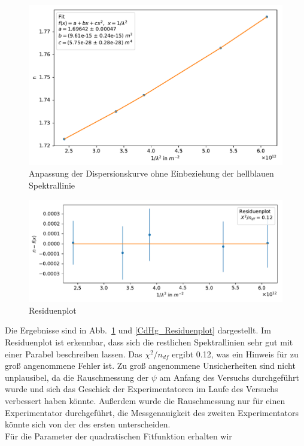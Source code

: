 \documentclass[12pt,a4paper]{article}
\begin{document}
\begin{figure}[H]
	\centering
	\includegraphics[width=0.95\linewidth]{Python/CdHg_Fit.pdf}
	\caption{Anpassung der Dispersionskurve ohne Einbeziehung der hellblauen Spektrallinie}
	\label{CdHg_LinReg}
\end{figure}
\begin{figure}[H]
	\centering
	\includegraphics[width=\linewidth]{Python/CdHg_Residuen.pdf}
	\caption{Residuenplot}
	\label{CdHg_Residuenplot}
\end{figure}
Die Ergebnisse sind in Abb.~\ref{CdHg_LinReg} und \eqref{CdHg_Residuenplot} dargestellt. Im Residuenplot ist erkennbar, dass sich die restlichen Spektrallinien sehr gut mit einer Parabel beschreiben lassen. Das $\chi^2/n_{df}$ ergibt 0.12, was ein Hinweis für zu groß angenommene Fehler ist. Zu groß angenommene Unsicherheiten sind nicht unplausibel, da die Rauschmessung der $\psi$ am Anfang des Versuchs durchgeführt wurde und sich das Geschick der Experimentatoren im Laufe des Versuchs verbessert haben könnte. Außerdem wurde die Rauschmessung nur für einen Experimentator durchgeführt, die Messgenauigkeit des zweiten Experimentators könnte sich von der des ersten unterscheiden.\\
Für die Parameter der quadratischen Fitfunktion erhalten wir
\end{document}
